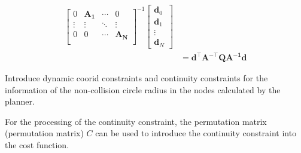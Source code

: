 \documentclass[conference]{IEEEtran}
\begin{document}
\begin{equation}
\begin{aligned}
\begin{bmatrix}
            0 & \boldsymbol{A_{1}}  &\cdots &0 \\ 
            \vdots &\vdots &\ddots &\vdots    \\
            0 & 0 &\cdots  &\boldsymbol{A_{N}} \\
            \end{bmatrix} ^{-1}
            \begin{bmatrix}
            \boldsymbol{d}_{0} \\
            \boldsymbol{d}_{1} \\
            \vdots  \\
            \boldsymbol{d}_{N} 
            \end{bmatrix}
            \\
            &= 
            \boldsymbol{d}^{\top} \boldsymbol{A}^{-\top}\boldsymbol{Q}\boldsymbol{A^{-1}}\boldsymbol{d}
        \end{aligned}
    \end{equation}

    Introduce dynamic coorid constraints and continuity constraints for the information of the non-collision circle radius in the nodes calculated by the planner.

    For the processing of the continuity constraint, the permutation matrix (permutation matrix) $C$ can be used to introduce the continuity constraint into the cost function.
    
\end{document}
